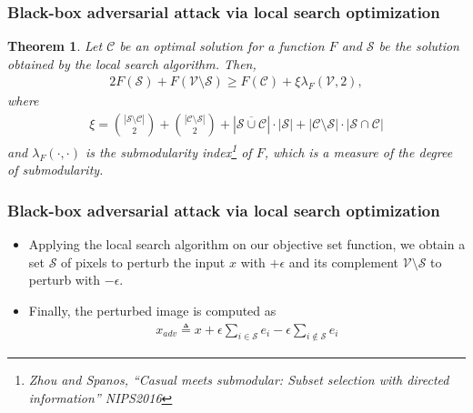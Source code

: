 \documentclass[10pt,mathserif]{beamer}
\newtheorem{thm}{Theorem}
\begin{document}
\begin{frame}
\frametitle{Black-box adversarial attack via local search optimization}
\setcounter{thm}{0}
\begin{thm}
Let $\mathcal{C}$ be an optimal solution for a function $F$ and $\mathcal{S}$ be the solution obtained by the local search algorithm. Then,
\begin{align*}
    2F(\mathcal{S})+F(\mathcal{V} \setminus \mathcal{S}) \ge  F(\mathcal{C}) + \xi \lambda_F(\mathcal{V}, 2),
\end{align*}
where 
\small
\begin{align*}
    \xi = \binom{|\mathcal{S} \setminus \mathcal{C}|}{2} + \binom{|\mathcal{C} \setminus \mathcal{S}|}{2} + |\overline{\mathcal{S} \cup \mathcal{C}}| \cdot |\mathcal{S}| + |\mathcal{C} \setminus \mathcal{S}| \cdot |\mathcal{S} \cap \mathcal{C}|
\end{align*}
\normalsize
    and $\lambda_{F}(\cdot,\cdot)$ is the submodularity index\footnote{\scriptsize {\color{blue} Zhou and Spanos}, ``Casual meets submodular: Subset selection with directed information'' {\color{gray} NIPS2016}} of $F$, which is a measure of the degree of submodularity.
\end{thm}
\end{frame}

\begin{frame}
\frametitle{Black-box adversarial attack via local search optimization}
\begin{itemize}\itemsep=12pt
\item Applying the local search algorithm on our objective set function, we obtain a set $\mathcal{S}$ of pixels to perturb the input $x$ with $+\epsilon$ and its complement $\mathcal{V} \setminus \mathcal{S}$ to perturb with $-\epsilon$.\pause
\item Finally, the perturbed image is computed as
\begin{align*}
x_{adv} \triangleq x + \epsilon \sum_{i \in \mathcal{S}}e_i - \epsilon \sum_{i \notin \mathcal{S}}e_i
\end{align*}
\end{itemize}
\end{frame}
\end{document}
